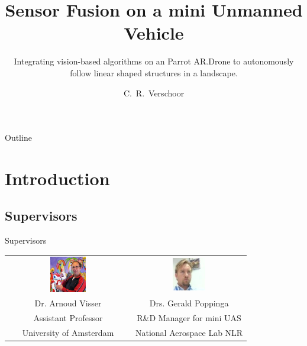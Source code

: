 \documentclass{beamer}
\title[Sensor Fusion on a mini Unmanned Vehicle]
{Sensor Fusion on a mini Unmanned Vehicle}
\subtitle{Integrating vision-based algorithms on an Parrot AR.Drone to autonomously follow linear shaped structures in a landscape.}
\author[Verschoor ] %
{C.~R.~Verschoor}
\institute[University of Amsterdam] %
{
  Faculty of Science (FNWI) \\
  University of Amsterdam
}
\begin{document}
\begin{frame}
  \titlepage
\end{frame}

\begin{frame}{Outline}
  \setcounter{tocdepth}{1}
  \tableofcontents
\end{frame}

\section{Introduction}
\subsection{Supervisors}
\begin{frame}{Supervisors}
\begin{center}
\begin{tabular}{ c c }
\includegraphics[width = 0.3\textwidth]{visser.jpg} & \includegraphics[width = 0.3\textwidth]{poppinga.jpg}\\
Dr. Arnoud Visser & Drs. Gerald Poppinga\\
Assistant Professor & R\&D Manager for mini UAS\\
University of Amsterdam & National Aerospace Lab NLR
\end{tabular}
\end{center}
\end{frame}
\end{document}

